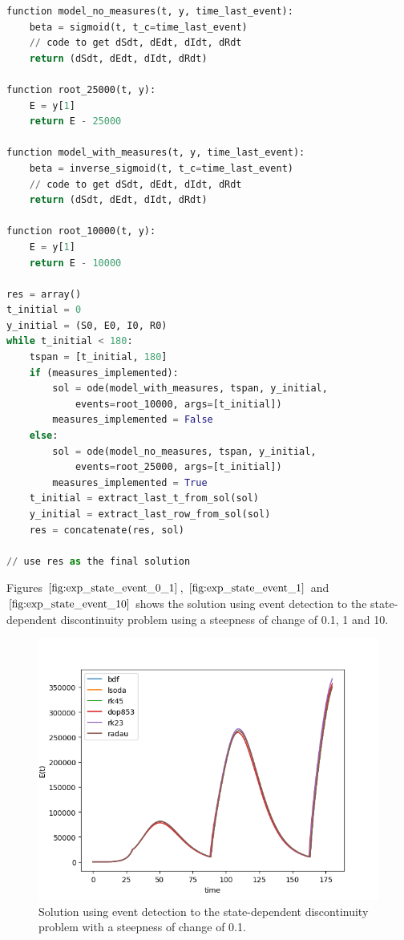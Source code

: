 \begin{minipage}{\linewidth}
\centering
\begin{lstlisting}[language=Python]
function model_no_measures(t, y, time_last_event):
    beta = sigmoid(t, t_c=time_last_event)
    // code to get dSdt, dEdt, dIdt, dRdt
    return (dSdt, dEdt, dIdt, dRdt)

function root_25000(t, y):
    E = y[1]
    return E - 25000

function model_with_measures(t, y, time_last_event):
    beta = inverse_sigmoid(t, t_c=time_last_event)
    // code to get dSdt, dEdt, dIdt, dRdt
    return (dSdt, dEdt, dIdt, dRdt)

function root_10000(t, y):
    E = y[1]
    return E - 10000

res = array()
t_initial = 0
y_initial = (S0, E0, I0, R0)
while t_initial < 180:
    tspan = [t_initial, 180]
    if (measures_implemented):
        sol = ode(model_with_measures, tspan, y_initial,
            events=root_10000, args=[t_initial])
        measures_implemented = False
    else:
        sol = ode(model_no_measures, tspan, y_initial,
            events=root_25000, args=[t_initial])
        measures_implemented = True
    t_initial = extract_last_t_from_sol(sol)
    y_initial = extract_last_row_from_sol(sol)
    res = concatenate(res, sol)

// use res as the final solution
\end{lstlisting}
\end{minipage}

Figures $\ref{fig:exp_state_event_0_1}$, $\ref{fig:exp_state_event_1}$ and $\ref{fig:exp_state_event_10}$ shows the solution using event detection to the state-dependent discontinuity problem using a steepness of change of 0.1, 1 and 10.

\begin{figure}[H]
\centering
\includegraphics[width=0.7\linewidth]{./figures/exp_state_event_0_1}
\caption{Solution using event detection to the state-dependent discontinuity problem with a steepness of change of 0.1.}
\label{fig:exp_state_event_0_1}
\end{figure}

